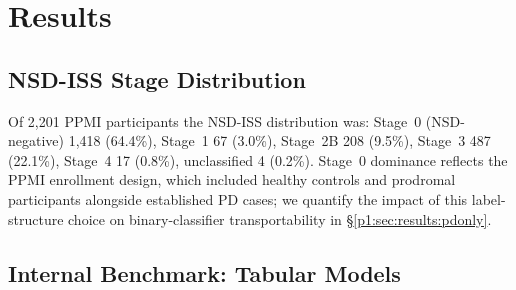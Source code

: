 \section{Results}
\label{p1:sec:results}

\subsection{NSD-ISS Stage Distribution}
Of 2{,}201 PPMI participants the NSD-ISS distribution was: Stage~0 (NSD-negative) 1{,}418 (64.4\%), Stage~1 67 (3.0\%), Stage~2B 208 (9.5\%), Stage~3 487 (22.1\%), Stage~4 17 (0.8\%), unclassified 4 (0.2\%). Stage~0 dominance reflects the PPMI enrollment design, which included healthy controls and prodromal participants alongside established PD cases; we quantify the impact of this label-structure choice on binary-classifier transportability in \S\ref{p1:sec:results:pdonly}.

\subsection{Internal Benchmark: Tabular Models}

